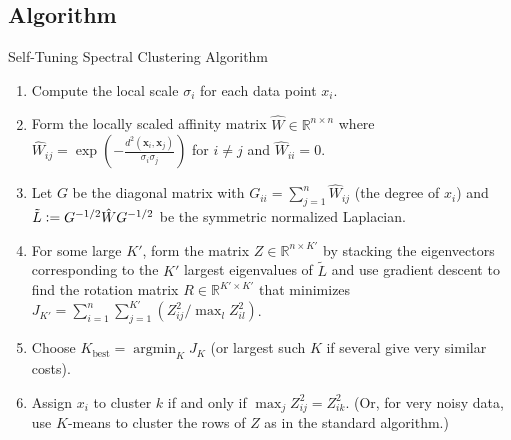 \documentclass[aspectratio=169]{beamer}
\DeclareMathOperator*{\argmin}{argmin}
\begin{document}
\subsection{Algorithm}
\begin{frame}{Self-Tuning Spectral Clustering Algorithm}
  \begin{enumerate}[<+->]
    \item Compute the local scale $\sigma_i$ for each data point $x_i$.
    \item Form the locally scaled affinity matrix $\hat{W} \in \mathbb{R}^{n \times n}$ where $\hat{W}_{ij} = \exp\left(-\frac{d^2(\mathbf{x}_i, \mathbf{x}_j)}{\sigma_i \sigma_j}\right)$ for $i \neq j$ and $\hat{W}_{ii} = 0$. 
    \item Let $G$ be the diagonal matrix with $G_{ii} = \sum_{j=1}^n \hat{W}_{ij}$ (the degree of $x_i$) and $\tilde{L} \vcentcolon = G^{-1/2} \hat{W} G^{-1/2}$ be the symmetric normalized Laplacian.
    \item For some large $K'$, form the matrix $Z \in \mathbb{R}^{n \times K'}$ by stacking the eigenvectors corresponding to the $K'$ largest eigenvalues of $\tilde{L}$ and use gradient descent to find the rotation matrix $R \in \mathbb{R}^{K' \times K'}$ that minimizes $J_{K'} = \sum_{i=1}^n \sum_{j=1}^{K'} (Z_{ij}^2 / \max_l Z_{il}^2)$. %
    \item Choose $K_{\text{best}} = \argmin_K J_K$ (or largest such $K$ if several give very similar costs).
    \item Assign $x_i$ to cluster $k$ if and only if $\max_j Z_{ij}^2 = Z_{ik}^2$. 
    (Or, for very noisy data, use $K$-means to cluster the rows of $Z$ as in the standard algorithm.)
  \end{enumerate}
\cite{zelnik-manor_self-tuning_2004}
\end{frame}
\end{document}
